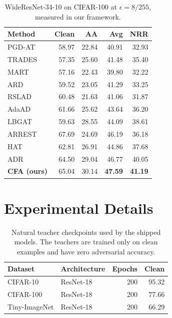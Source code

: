 \begin{table}[!htbp]
  \centering \small \setlength{\tabcolsep}{5pt}
  \caption{WideResNet-34-10 on CIFAR-100 at $\epsilon=8/255$, measured in our framework.}
  \label{tab:wrn100}
  \begin{tabular}{lrrrr}
    \toprule
    Method & Clean & AA & Avg & NRR \\
    \midrule
    PGD-AT & 58.97 & 22.84 & 40.91 & 32.93 \\
    TRADES & 57.35 & 25.60 & 41.48 & 35.40 \\
    MART & 57.16 & 22.43 & 39.80 & 32.22 \\
    \midrule
    ARD & 59.52 & 23.05 & 41.29 & 33.25 \\
    RSLAD & 60.48 & 21.63 & 41.06 & 31.87 \\
    AdaAD & 61.66 & 25.62 & 43.64 & 36.20 \\
    LBGAT & 59.63 & 28.55 & 44.09 & 38.61 \\
    ARREST & 67.69 & 24.69 & 46.19 & 36.18 \\
    HAT & 62.81 & 26.91 & 44.86 & 37.68 \\
    ADR & 64.50 & 29.04 & 46.77 & 40.05 \\
    \midrule
    \textbf{CFA (ours)} & 65.04 & 30.14 & \textbf{47.59} & \textbf{41.19} \\
    \bottomrule
  \end{tabular}
\end{table}

\section{Experimental Details}
\label{app:repro}

\begin{table}[!htbp]
  \centering \small \setlength{\tabcolsep}{5pt}
  \caption{Natural teacher checkpoints used by the shipped models. The teachers are trained only on
  clean examples and have zero adversarial accuracy.}
  \label{tab:teachers}
  \begin{tabular}{llrr}
    \toprule
    Dataset & Architecture & Epochs & Clean \\
    \midrule
    CIFAR-10      & ResNet-18 & 200 & 95.32 \\
    CIFAR-100     & ResNet-18 & 200 & 77.66 \\
    Tiny-ImageNet & ResNet-18 & 200 & 66.29 \\
    \bottomrule
  \end{tabular}
\end{table}

